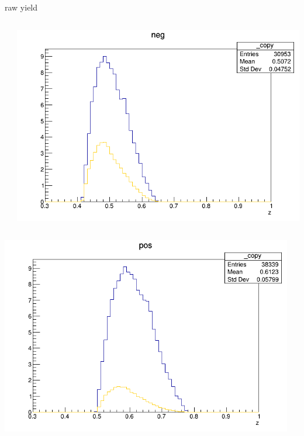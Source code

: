 \begin{frame}{raw yield}
\begin{columns}
\begin{column}[T]{0.25\textwidth}
\end{column}
\begin{column}[T]{0.25\textwidth}
\includegraphics[width = \textwidth]{results/yield/statistics/yield_x_Q2_z_0.50_5.000_0.50_neg.png}
\end{column}
\end{columns}
\begin{columns}
\begin{column}[T]{0.25\textwidth}
\includegraphics[width = \textwidth]{results/yield/statistics/yield_x_Q2_z_0.50_5.000_0.60_pos.png}
\end{column}
\begin{column}[T]{0.25\textwidth}

\end{column}
\end{columns}
\end{frame}
